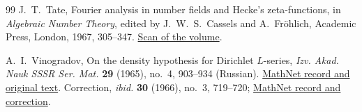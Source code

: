 \begin{thebibliography}{99}
J.~T.~Tate,
Fourier analysis in number fields and Hecke's zeta-functions,
in \emph{Algebraic Number Theory}, edited by J.~W.~S.~Cassels and
A.~Fr\"ohlich, Academic Press, London, 1967, 305--347.
\href{https://math.arizona.edu/~cais/scans/Cassels-Frohlich-Algebraic_Number_Theory.pdf}{Scan of the volume}.

A.~I.~Vinogradov,
On the density hypothesis for Dirichlet \(L\)-series,
\emph{Izv. Akad. Nauk SSSR Ser. Mat.} \textbf{29} (1965),
no.~4, 903--934 (Russian).
\href{https://www.mathnet.ru/eng/im3080}{MathNet record and original text}.
Correction, \emph{ibid.} \textbf{30} (1966), no.~3, 719--720;
\href{https://www.mathnet.ru/eng/im2856}{MathNet record and correction}.

\end{thebibliography}
